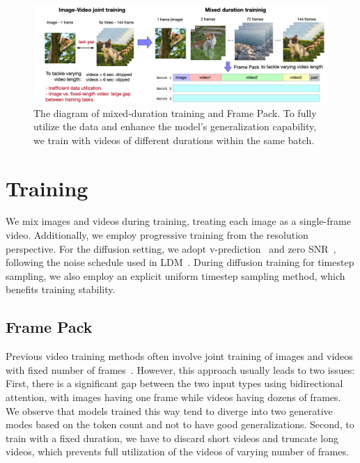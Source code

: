 \begin{figure}[ht]
\begin{center}
\includegraphics[width=\linewidth]{images/CogVideoX.png}
\end{center}
\caption{
The diagram of mixed-duration training and Frame Pack. To fully utilize the data and enhance the model's generalization capability, we train with videos of different durations within the same batch.}
\label{fig:framepack}
\end{figure}

\section{Training \model}

We mix images and videos during training, treating each image as a single-frame video. 
Additionally, we employ progressive training from the resolution perspective. 
For the diffusion setting, we adopt v-prediction~\citep{salimans2022progressive} and zero SNR~\citep{lin2024common}, following the noise schedule used in LDM~\citep{rombach2022high}.
During diffusion training for timestep sampling, we also employ an explicit uniform timestep sampling method, which benefits training stability. 

\subsection{Frame Pack}
Previous video training methods often involve joint training of images and videos with fixed number of frames~\citep{singer2022make, blattmann2023stable}. 
However, this approach usually leads to two issues: 
First, there is a significant gap between the two input types using bidirectional attention, with images having one frame while videos having dozens of frames. 
We observe that models trained this way tend to diverge into two generative modes based on the token count and not to have good generalizations. %
Second, to train with a fixed duration, we have to discard short videos and truncate long videos, which prevents full utilization of the videos of varying number of frames.

